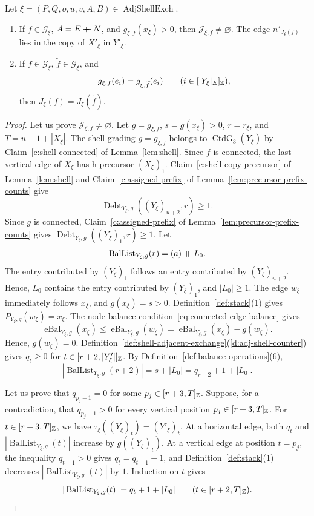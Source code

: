 \begin{lemma}\label{lem:exchange-repair-index}
Let $\xi=(P,Q,o,u,v,A,B)\in\operatorname{AdjShellExch}$.
\begin{enumerate}
\item\label{c:repair-index-exists} If $f\in\mathcal G_\xi$, $A=E\mathbin{+\mkern-10mu+} N$, and $g_{\xi,f}(x_\xi)>0$, then $\mathcal J_{\xi,f}\ne\varnothing$.
The edge $n'_{J_\xi(f)}$ lies in the copy of $X'_\xi$ in $Y'_\xi$.
\item\label{c:repair-index-horizontal} If $f\in\mathcal G_\xi$, $\widetilde f\in\mathcal G_\xi$, and
\[
 g_{\xi,f}(e_i)=g_{\xi,\widetilde f}(e_i)
 \qquad(i\in[|Y_\xi|_E]_{\mathbb Z}),
\]
then $J_\xi(f)=J_\xi(\widetilde f)$.
\end{enumerate}
\end{lemma}
\begin{proof}
 Let us prove $\mathcal J_{\xi,f}\ne\varnothing$.
Let $g=g_{\xi,f}$, $s=g(x_\xi)>0$, $r=r_\xi$, and $T=u+1+|X_\xi|$.
The shell grading $g=g_{\xi,f}$ belongs to $\operatorname{CtdG}_3(Y_\xi)$ by Claim~\ref{c:shell-connected} of Lemma~\ref{lem:shell}.
Since $f$ is connected, the last vertical edge of $X_\xi$ has h-precursor $(X_\xi)_1$.
Claim~\ref{c:shell-copy-precursor} of Lemma~\ref{lem:shell} and Claim~\ref{c:assigned-prefix} of Lemma~\ref{lem:precursor-prefix-counts} give
\[
 \operatorname{Debt}_{Y_\xi,g}((Y_\xi)_{u+2},r)\ge1.
\]
Since $g$ is connected, Claim~\ref{c:assigned-prefix} of Lemma~\ref{lem:precursor-prefix-counts} gives $\operatorname{Debt}_{Y_\xi,g}((Y_\xi)_1,r)\ge1$.
Let
\[
 \operatorname{BalList}_{Y_\xi,g}(r)=(a)\mathbin{+\mkern-10mu+} L_0.
\]
The entry contributed by $(Y_\xi)_1$ follows an entry contributed by $(Y_\xi)_{u+2}$.
Hence, $L_0$ contains the entry contributed by $(Y_\xi)_1$, and $|L_0|\ge1$.
The edge $w_\xi$ immediately follows $x_\xi$, and $g(x_\xi)=s>0$.
Definition~\ref{def:stack}(1) gives $P_{Y_\xi,g}(w_\xi)=x_\xi$.
The node balance condition~\eqref{eq:connected-edge-balance} gives
\[
 \operatorname{eBal}_{Y_\xi,g}(x_\xi)
 \le\operatorname{eBal}_{Y_\xi,g}(w_\xi)
 =\operatorname{eBal}_{Y_\xi,g}(x_\xi)-g(w_\xi).
\]
Hence, $g(w_\xi)=0$.
Definition~\ref{def:shell-adjacent-exchange}(\ref{d:adj-shell-counter}) gives $q_t\ge0$ for $t\in[r+2,|Y'_\xi|]_{\mathbb Z}$.
By Definition~\ref{def:balance-operations}(6),
\[
 |\operatorname{BalList}_{Y_\xi,g}(r+2)|
 =s+|L_0|=q_{r+2}+1+|L_0|.
\]

Let us prove that $q_{p_j-1}=0$ for some $p_j\in[r+3,T]_{\mathbb Z}$.
Suppose, for a contradiction, that $q_{p_j-1}>0$ for every vertical position $p_j\in[r+3,T]_{\mathbb Z}$.
For $t\in[r+3,T]_{\mathbb Z}$, we have $\tau_\xi((Y_\xi)_t)=(Y'_\xi)_t$.
At a horizontal edge, both $q_t$ and $|\operatorname{BalList}_{Y_\xi,g}(t)|$ increase by $g((Y_\xi)_t)$.
At a vertical edge at position $t=p_j$, the inequality $q_{t-1}>0$ gives $q_t=q_{t-1}-1$, and Definition~\ref{def:stack}(1) decreases $|\operatorname{BalList}_{Y_\xi,g}(t)|$ by $1$.
Induction on $t$ gives
\[
 |\operatorname{BalList}_{Y_\xi,g}(t)|=q_t+1+|L_0|
 \qquad(t\in[r+2,T]_{\mathbb Z}).
\]


\end{proof}

